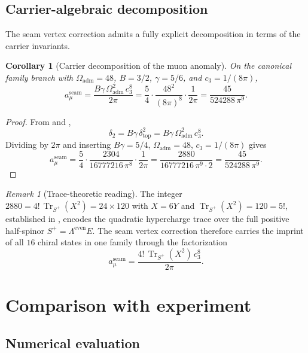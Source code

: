 \documentclass[11pt,a4paper]{article}
\newtheorem{corollary}[theorem]{Corollary}
\theoremstyle{definition}
\theoremstyle{remark}
\newtheorem*{remark}{Remark}
\DeclareMathOperator{\tr}{Tr}
\newcommand{\cthree}{c_3}
\newcommand{\deltatop}{\delta_{\mathrm{top}}}
\newcommand{\gammaY}{\gamma}
\newcommand{\Oadm}{\Omega_{\mathrm{adm}}}
\numberwithin{equation}{section}
\begin{document}
\subsection{Carrier-algebraic decomposition}

The seam vertex correction admits a fully explicit decomposition in terms of
the carrier invariants.

\begin{corollary}[Carrier decomposition of the muon anomaly]
\label{cor:carrier-decomposition}
On the canonical family branch with $\Oadm=48$, $B=3/2$, $\gammaY=5/6$,
and $\cthree=1/(8\pi)$,
\begin{equation}\label{eq:carrier-decomposition}
a_\mu^{\mathrm{seam}}
=
\frac{B\gammaY\,\Oadm^2\,\cthree^8}{2\pi}
=
\frac{5}{4}\cdot\frac{48^2}{(8\pi)^8}\cdot\frac{1}{2\pi}
=
\frac{45}{524288\,\pi^9}.
\end{equation}
\end{corollary}

\begin{proof}
From  and ,
\[
\delta_2
=
B\gammaY\,\deltatop^2
=
B\gammaY\,\Oadm^2\,\cthree^8.
\]
Dividing by $2\pi$ and inserting $B\gammaY=5/4$, $\Oadm=48$,
$\cthree=1/(8\pi)$ gives
\[
a_\mu^{\mathrm{seam}}
=
\frac54\cdot\frac{2304}{16777216\,\pi^8}\cdot\frac{1}{2\pi}
=
\frac{2880}{16777216\,\pi^9\cdot 2}
=
\frac{45}{524288\,\pi^9}.
\]
\end{proof}

\begin{remark}[Trace-theoretic reading]
The integer $2880=4!\,\tr_{S^+}(X^2)=24\times120$ with $X=6Y$ and
$\tr_{S^+}(X^2)=120=5!$, established in \cite[Corollary~5.9]{TFPT31},
encodes the quadratic hypercharge trace over the full positive half-spinor
$S^+=\Lambda^{\mathrm{even}}E$. The seam vertex correction therefore
carries the imprint of all $16$ chiral states in one family through the
factorization
\[
a_\mu^{\mathrm{seam}}
=
\frac{4!\,\tr_{S^+}(X^2)\,\cthree^8}{2\pi}.
\]
\end{remark}


\section{Comparison with experiment}\label{sec:comparison}

\subsection{Numerical evaluation}
\end{document}
